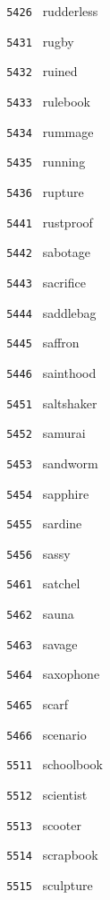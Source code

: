 \documentclass[11pt]{article}
\begin{document}
\begin{multicols}{6}
\noindent \texttt{ 5426 } rudderless  \par
\vspace{3mm}
\noindent \texttt{ 5431 } rugby  \par
\noindent \texttt{ 5432 } ruined  \par
\noindent \texttt{ 5433 } rulebook  \par
\noindent \texttt{ 5434 } rummage  \par
\noindent \texttt{ 5435 } running  \par
\noindent \texttt{ 5436 } rupture  \par
\vspace{3mm}
\noindent \texttt{ 5441 } rustproof  \par
\noindent \texttt{ 5442 } sabotage  \par
\noindent \texttt{ 5443 } sacrifice  \par
\noindent \texttt{ 5444 } saddlebag  \par
\noindent \texttt{ 5445 } saffron  \par
\noindent \texttt{ 5446 } sainthood  \par
\vspace{3mm}
\noindent \texttt{ 5451 } saltshaker  \par
\noindent \texttt{ 5452 } samurai  \par
\noindent \texttt{ 5453 } sandworm  \par
\noindent \texttt{ 5454 } sapphire  \par
\noindent \texttt{ 5455 } sardine  \par
\noindent \texttt{ 5456 } sassy  \par
\vspace{3mm}
\noindent \texttt{ 5461 } satchel  \par
\noindent \texttt{ 5462 } sauna  \par
\noindent \texttt{ 5463 } savage  \par
\noindent \texttt{ 5464 } saxophone  \par
\noindent \texttt{ 5465 } scarf  \par
\noindent \texttt{ 5466 } scenario  \par
\noindent \texttt{ 5511 } schoolbook  \par
\noindent \texttt{ 5512 } scientist  \par
\noindent \texttt{ 5513 } scooter  \par
\noindent \texttt{ 5514 } scrapbook  \par
\noindent \texttt{ 5515 } sculpture  \par

\end{multicols}
\end{document}
